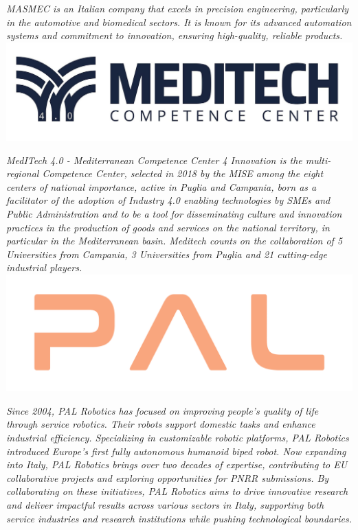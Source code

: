 \documentclass[
	openany, %
	parskip=full, %
	12pt, %
	a4paper, %
]{conferencebooklet} %
\begin{document}
\begin{multicols*}{2}
    \textit{MASMEC is an Italian company that excels in precision engineering, particularly in the automotive and biomedical sectors. It is known for its advanced automation systems and commitment to innovation, ensuring high-quality, reliable products.} \\

    \hfill\includegraphics[width=\sponsorscaling\linewidth]{logos/meditech.jpg}\hspace*{\fill}

    \textit{MedITech 4.0 - Mediterranean Competence Center 4 Innovation is the multi-regional Competence Center, selected in 2018 by the MISE among the eight centers of national importance, active in Puglia and Campania, born as a facilitator of the adoption of Industry 4.0 enabling technologies by SMEs and Public Administration and to be a tool for disseminating culture and innovation practices in the production of goods and services on the national territory, in particular in the Mediterranean basin.   Meditech counts on the collaboration of 5 Universities from Campania, 3 Universities from Puglia and 21 cutting-edge industrial players.} \\   

    \hfill\includegraphics[width=\sponsorscaling\linewidth]{logos/pal.png}\hspace*{\fill}
    
    \textit{Since 2004, PAL Robotics has focused on improving people's quality of life through service robotics. Their robots support domestic tasks and enhance industrial efficiency. Specializing in customizable robotic platforms, PAL Robotics introduced Europe’s first fully autonomous humanoid biped robot. Now expanding into Italy, PAL Robotics brings over two decades of expertise, contributing to EU collaborative projects and exploring opportunities for PNRR submissions. By collaborating on these initiatives, PAL Robotics aims to drive innovative research and deliver impactful results across various sectors in Italy, supporting both service industries and research institutions while pushing technological boundaries.} \\


\end{multicols*}
\end{document}
